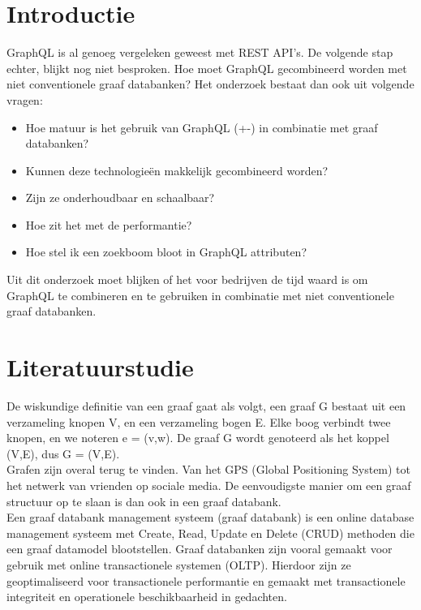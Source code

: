 
\section{Introductie} %
\label{sec:introductie}
GraphQL is al genoeg vergeleken geweest met REST API's. De volgende stap echter, blijkt  nog niet besproken. Hoe moet GraphQL gecombineerd worden met niet conventionele graaf databanken? 
Het onderzoek bestaat dan ook uit volgende vragen:
\begin{itemize}
	\item Hoe matuur is het gebruik van GraphQL (+-) in combinatie met graaf databanken? 
	\item Kunnen deze technologieën makkelijk gecombineerd worden?
	\item Zijn ze onderhoudbaar en schaalbaar?
	\item Hoe zit het met de performantie?
	\item Hoe stel ik een zoekboom bloot in GraphQL attributen?
\end{itemize}

Uit dit onderzoek moet blijken of het voor bedrijven de tijd waard is om GraphQL te combineren en te gebruiken in combinatie met niet conventionele graaf databanken.


\section{Literatuurstudie}
\label{sec:literatuurstudie}
De wiskundige definitie van een graaf gaat als volgt, een graaf G bestaat uit een verzameling knopen V, en een verzameling bogen E. Elke boog verbindt twee knopen, en we noteren e = (v,w). De graaf G wordt genoteerd als het koppel (V,E), dus G = (V,E). \autocite{pod2Cursus}\\
Grafen zijn overal terug te vinden. Van het GPS (Global Positioning System) tot het netwerk van vrienden op sociale media. De eenvoudigste manier om een graaf structuur op te slaan is dan ook in een graaf databank. \\
Een graaf databank management systeem (graaf databank) is een online database management systeem met Create, Read, Update en Delete (CRUD) methoden die een graaf datamodel blootstellen. Graaf databanken zijn vooral gemaakt voor gebruik met online transactionele systemen (OLTP). Hierdoor zijn ze geoptimaliseerd voor transactionele performantie en gemaakt met transactionele integriteit en operationele beschikbaarheid in gedachten.

